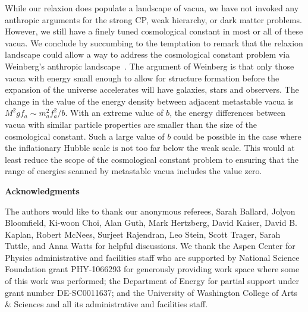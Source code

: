 \documentclass[12pt,aps,prd,showpacs,notitlepage,nofootinbib]{revtex4-1}
\begin{document}
While our relaxion does populate a landscape of vacua, we have not invoked any anthropic arguments for the strong CP, weak hierarchy, or dark matter problems. However, we still have a finely tuned cosmological constant in most or all of these vacua.  We conclude by succumbing to the temptation to remark that the relaxion landscape could allow a way to address the cosmological constant problem via Weinberg's  anthropic landscape~\cite{Weinberg:1987dv}.  The argument of Weinberg is that only those vacua with energy small enough to allow for structure formation before the expansion of the universe accelerates will have galaxies, stars and observers. The change in the value of the energy density between adjacent metastable vacua is $M^2 g f_a\sim m_a^2 f_a^2 /b$.  With an  extreme value  of $b$, the energy differences between vacua with similar particle properties  are smaller than the size of the cosmological constant.  Such a large value of $b$ could be possible in the case where the inflationary Hubble scale is not too far below the weak scale. This would at least reduce the scope of the cosmological constant problem to ensuring that the range of energies scanned by  metastable vacua includes the value zero.

\bigskip
\begin{center}{\bf Acknowledgments}\end{center}


The authors would like to thank our anonymous referees, Sarah Ballard, Jolyon Bloomfield, Ki-woon Choi, Alan Guth, Mark Hertzberg, David Kaiser, David B. Kaplan, Robert McNees, Surjeet Rajendran, Leo Stein, Scott Trager, Sarah Tuttle, and Anna Watts for helpful discussions. We thank the Aspen Center for Physics administrative and facilities staff who are supported by National Science Foundation grant PHY-1066293 for generously providing work space where some of this work was performed; the Department of Energy for partial support under grant number DE-SC0011637; and the University of Washington College of Arts \& Sciences and all its administrative and facilities staff. 


%
%	
%
 
\end{document}
